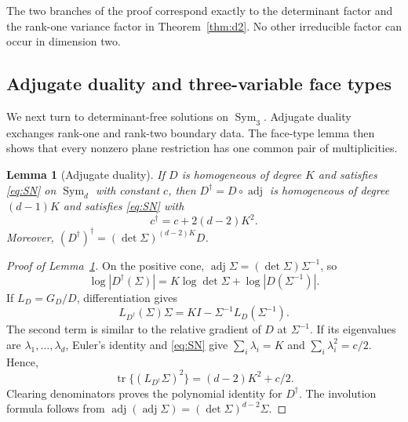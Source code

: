 \documentclass[12pt,a4paper]{article}
\theoremstyle{plain}
\newtheorem{lemma}{Lemma}
\theoremstyle{definition}
\newcommand{\Sym}{\operatorname{Sym}}
\newcommand{\tr}{\operatorname{tr}}
\newcommand{\adjm}{\operatorname{adj}}
\begin{document}
The two branches of the proof correspond exactly to the determinant factor and the rank-one variance factor in Theorem~\ref{thm:d2}.
No other irreducible factor can occur in dimension two.

\subsection{Adjugate duality and three-variable face types}
\label{supp:d3-face-types}

We next turn to determinant-free solutions on $\Sym_3$.
Adjugate duality exchanges rank-one and rank-two boundary data.
The face-type lemma then shows that every nonzero plane restriction has one common pair of multiplicities.

\begin{lemma}[Adjugate duality]
\label{lem:adj-supp}
    If $D$ is homogeneous of degree $K$ and satisfies \eqref{eq:SN} on $\Sym_d$ with constant $c$, then $D^\dagger=D\circ\adjm$ is homogeneous of degree $(d-1)K$ and satisfies \eqref{eq:SN} with
    \begin{equation*}
        c^\dagger
        =
        c+2(d-2)K^2
        .
    \end{equation*}
    Moreover, $(D^\dagger)^\dagger=(\det\Sigma)^{(d-2)K}D$.
\end{lemma}

\begin{proof}[Proof of Lemma~\ref{lem:adj-supp}]
    On the positive cone, $\adjm\Sigma=(\det\Sigma)\Sigma^{-1}$, so
    \begin{equation*}
        \log|D^\dagger(\Sigma)|
        =
        K\log\det\Sigma+\log|D(\Sigma^{-1})|
        .
    \end{equation*}
    If $L_D=G_D/D$, differentiation gives
    \begin{equation*}
        L_{D^\dagger}(\Sigma)\Sigma
        =
        KI-\Sigma^{-1}L_D(\Sigma^{-1})
        .
    \end{equation*}
    The second term is similar to the relative gradient of $D$ at $\Sigma^{-1}$.
    If its eigenvalues are $\lambda_1,\ldots,\lambda_d$, Euler's identity and \eqref{eq:SN} give $\sum_i\lambda_i=K$ and $\sum_i\lambda_i^2=c/2$.
    Hence,
    \begin{equation*}
        \tr\{(L_{D^\dagger}\Sigma)^2\}
        =
        (d-2)K^2+c/2
        .
    \end{equation*}
    Clearing denominators proves the polynomial identity for $D^\dagger$.
    The involution formula follows from $\adjm(\adjm\Sigma)=(\det\Sigma)^{d-2}\Sigma$.
\end{proof}
\end{document}
